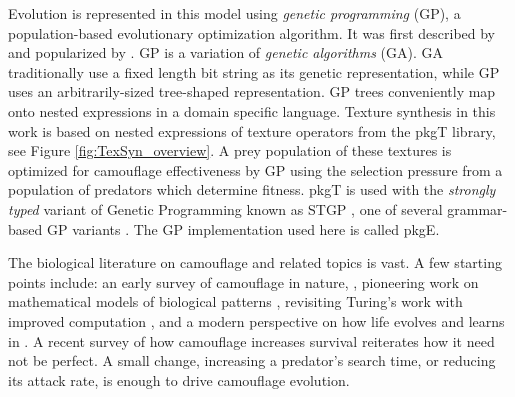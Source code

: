\documentclass[letterpaper]{article}
\newcommand{\jargon}[1]{\textit{#1}}
\newcommand{\texsyn}[0]{pkgT}
\newcommand{\lazypredator}[0]{pkgE}
\begin{document}
\par
Evolution is represented in this model using \jargon{genetic programming} (GP), a population-based evolutionary optimization algorithm. It was first described by \citet{cramer_representation_1985} and popularized by \citet{koza_genetic_1992}. GP is a variation of \jargon{genetic algorithms} (GA). GA traditionally use a fixed length bit string as its genetic representation, while GP uses an arbitrarily-sized tree-shaped representation. GP trees conveniently map onto nested expressions in a domain specific language. Texture synthesis in this work is based on nested expressions of texture operators from the \texsyn{} library, see Figure \ref{fig:TexSyn_overview}. A prey population of these textures is optimized for camouflage effectiveness by GP using the selection pressure from a population of predators which determine fitness. \texsyn{} is used with the \jargon{strongly typed} variant of Genetic Programming known as STGP \cite{montana_strongly_1995}, one of several grammar-based GP variants \cite{Mckay_2010}. The GP implementation used here is called \lazypredator{}.
\par
The biological literature on camouflage and related topics is vast. A few starting points include: an early survey of camouflage in nature, \citet{thayer_concealing-coloration_1909}, pioneering work on mathematical models of biological patterns \citet{turing_chemical_1952}, revisiting Turing's work with improved computation \citet{murray_how_1988}, and a modern perspective on how life evolves and learns in \citet{valiant_probably_2013}. A recent survey of how camouflage increases survival \cite{de_alcantara_viana_predator_2022} reiterates how it need not be perfect. A small change, increasing a predator's search time, or reducing its attack rate, is enough to drive camouflage evolution.
\par


\end{document}

